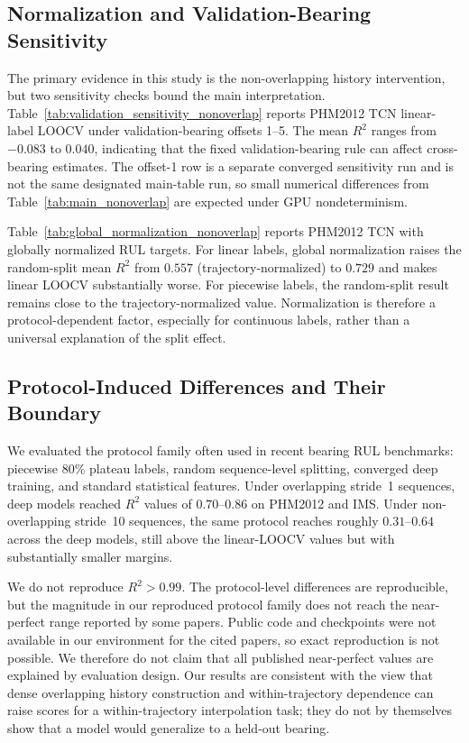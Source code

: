 \documentclass[pdflatex,sn-basic,NameDate]{sn-jnl}
\begin{document}



\subsection{Normalization and Validation-Bearing Sensitivity}
The primary evidence in this study is the non-overlapping history intervention, but two sensitivity checks bound the main interpretation. Table~\ref{tab:validation_sensitivity_nonoverlap} reports PHM2012 TCN linear-label LOOCV under validation-bearing offsets 1--5. The mean $R^2$ ranges from $-0.083$ to $0.040$, indicating that the fixed validation-bearing rule can affect cross-bearing estimates. The offset-1 row is a separate converged sensitivity run and is not the same designated main-table run, so small numerical differences from Table~\ref{tab:main_nonoverlap} are expected under GPU nondeterminism.

Table~\ref{tab:global_normalization_nonoverlap} reports PHM2012 TCN with globally normalized RUL targets. For linear labels, global normalization raises the random-split mean $R^2$ from $0.557$ (trajectory-normalized) to $0.729$ and makes linear LOOCV substantially worse. For piecewise labels, the random-split result remains close to the trajectory-normalized value. Normalization is therefore a protocol-dependent factor, especially for continuous labels, rather than a universal explanation of the split effect.





\subsection{Protocol-Induced Differences and Their Boundary}
We evaluated the protocol family often used in recent bearing RUL benchmarks: piecewise 80\% plateau labels, random sequence-level splitting, converged deep training, and standard statistical features. Under overlapping stride~1 sequences, deep models reached $R^2$ values of $0.70$--$0.86$ on PHM2012 and IMS. Under non-overlapping stride~10 sequences, the same protocol reaches roughly $0.31$--$0.64$ across the deep models, still above the linear-LOOCV values but with substantially smaller margins.

We do not reproduce $R^2>0.99$. The protocol-level differences are reproducible, but the magnitude in our reproduced protocol family does not reach the near-perfect range reported by some papers. Public code and checkpoints were not available in our environment for the cited papers, so exact reproduction is not possible. We therefore do not claim that all published near-perfect values are explained by evaluation design. Our results are consistent with the view that dense overlapping history construction and within-trajectory dependence can raise scores for a within-trajectory interpolation task; they do not by themselves show that a model would generalize to a held-out bearing.
\end{document}
